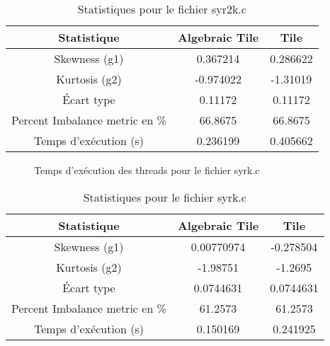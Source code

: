 \documentclass{article}
\begin{document}
\begin{table}[htbp]
  \centering
  \caption{Statistiques pour le fichier syr2k.c}
  \begin{tabular}{|c|c|c|}
    \hline
    Statistique & Algebraic Tile & Tile \\ 
    \hline
    Skewness (g1) & 0.367214 & 0.286622 \\ 
    Kurtosis (g2) & -0.974022 & -1.31019 \\ 
    Écart type & 0.11172 & 0.11172 \\ 
    Percent Imbalance metric en \% & 66.8675 & 66.8675 \\ 
    Temps d'exécution (s) &  0.236199      &  0.405662    \\ 
    \hline
  \end{tabular}
\end{table}
\newpage

\begin{figure}
  \centering
  \caption{Temps d'exécution des threads pour le fichier syrk.c}
  \label{fig:syrk.c}
\end{figure}

\begin{table}[htbp]
  \centering
  \caption{Statistiques pour le fichier syrk.c}
  \begin{tabular}{|c|c|c|}
    \hline
    Statistique & Algebraic Tile & Tile \\ 
    \hline
    Skewness (g1) & 0.00770974 & -0.278504 \\ 
    Kurtosis (g2) & -1.98751 & -1.2695 \\ 
    Écart type & 0.0744631 & 0.0744631 \\ 
    Percent Imbalance metric en \% & 61.2573 & 61.2573 \\ 
    Temps d'exécution (s) &  0.150169      &  0.241925    \\ 
    \hline
  \end{tabular}
\end{table}
\newpage
\end{document}

